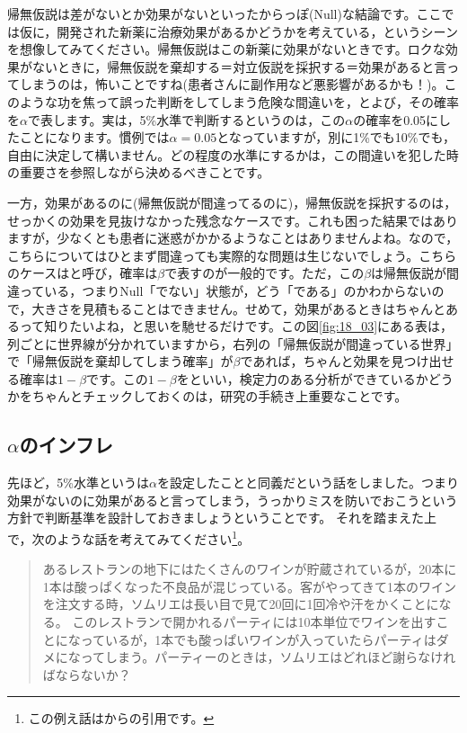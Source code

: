 \documentclass{ltjsbook}
\begin{document}
帰無仮説は差がないとか効果がないといったからっぽ(Null)な結論です。ここでは仮に，開発された新薬に治療効果があるかどうかを考えている，というシーンを想像してみてください。帰無仮説はこの新薬に効果がないときです。ロクな効果がないときに，帰無仮説を棄却する＝対立仮説を採択する＝効果があると言ってしまうのは，怖いことですね(患者さんに副作用など悪影響があるかも！)。このような功を焦って誤った判断をしてしまう危険な間違いを，とよび，その確率を$\alpha$で表します。実は，5\%水準で判断するというのは，この$\alpha$の確率を0.05にしたことになります。慣例では$\alpha=0.05$となっていますが，別に1\%でも10\%でも，自由に決定して構いません。どの程度の水準にするかは，この間違いを犯した時の重要さを参照しながら決めるべきことです。

一方，効果があるのに(帰無仮説が間違ってるのに)，帰無仮説を採択するのは，せっかくの効果を見抜けなかった残念なケースです。これも困った結果ではありますが，少なくとも患者に迷惑がかかるようなことはありませんよね。なので，こちらについてはひとまず間違っても実際的な問題は生じないでしょう。こちらのケースはと呼び，確率は$\beta$で表すのが一般的です。ただ，この$\beta$は帰無仮説が間違っている，つまりNull「でない」状態が，どう「である」のかわからないので，大きさを見積もることはできません。せめて，効果があるときはちゃんとあるって知りたいよね，と思いを馳せるだけです。この図\ref{fig:18_03}にある表は，列ごとに世界線が分かれていますから，右列の「帰無仮説が間違っている世界」で「帰無仮説を棄却してしまう確率」が$\beta$であれば，ちゃんと効果を見つけ出せる確率は$1-\beta$です。この$1-\beta$をといい，検定力のある分析ができているかどうかをちゃんとチェックしておくのは，研究の手続き上重要なことです。

\subsection{$\alpha$のインフレ}
\label{alphaInfration}
先ほど，5\%水準というは$\alpha$を設定したことと同義だという話をしました。つまり効果がないのに効果があると言ってしまう，うっかりミスを防いでおこうという方針で判断基準を設計しておきましょうということです。
それを踏まえた上で，次のような話を考えてみてください\footnote{この例え話は\textcite{BA33892274}からの引用です。}。
\begin{quote}
	あるレストランの地下にはたくさんのワインが貯蔵されているが，20本に1本は酸っぱくなった不良品が混じっている。客がやってきて1本のワインを注文する時，ソムリエは長い目で見て20回に1回冷や汗をかくことになる。
	このレストランで開かれるパーティには10本単位でワインを出すことになっているが，1本でも酸っぱいワインが入っていたらパーティはダメになってしまう。パーティーのときは，ソムリエはどれほど謝らなければならないか？
\end{quote}
\end{document}
